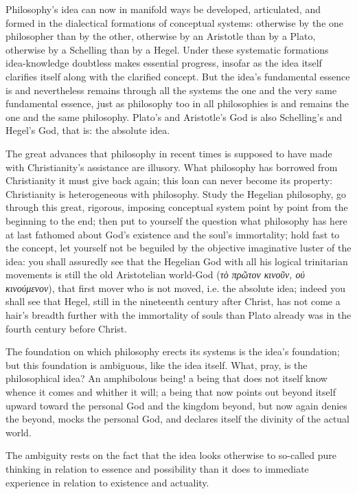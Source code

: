 \documentclass[12pt,a4paper]{book}
\begin{document}
Philosophy's idea can now in manifold ways be developed, articulated, and formed in the
dialectical formations of conceptual systems: otherwise by the one philosopher than by the
other, otherwise by an Aristotle than by a Plato, otherwise by a Schelling than by a Hegel.
Under these systematic formations idea-knowledge doubtless makes essential progress,
insofar as the idea itself clarifies itself along with the clarified concept. But the
idea's fundamental essence is and nevertheless remains through all the systems the one and
the very same fundamental essence, just as philosophy too in all philosophies is and
remains the one and the same philosophy. Plato's and Aristotle's God is also Schelling's
and Hegel's God, that is: the absolute idea.

The great advances that philosophy in recent times is supposed to have made with
Christianity's assistance are illusory. What philosophy has borrowed from Christianity it
must give back again; this loan can never become its property: Christianity is
heterogeneous with philosophy. Study the Hegelian philosophy, go through this great,
rigorous, imposing conceptual system point by point from the beginning to the end; then
put to yourself the question what philosophy has here at last fathomed about God's
existence and the soul's immortality; hold fast to the concept, let yourself not be
beguiled by the objective imaginative luster of the idea: you shall assuredly see that the
Hegelian God with all his logical trinitarian movements is still the old
Aristotelian world-God (\textit{τὸ πρῶτον κινοῦν, οὐ κινούμενον}), that first mover who is
not moved, i.e. the absolute idea; indeed you shall see that Hegel, still in the nineteenth
century after Christ, has not come a hair's breadth further with the immortality of souls
than Plato already was in the fourth century before Christ.

The foundation on which philosophy erects its systems is the idea's foundation; but this
foundation is ambiguous, like the idea itself. What, pray, is the philosophical idea? An
amphibolous being! a being that does not itself know whence it comes and whither it will;
a being that now points out beyond itself upward toward the personal God and the kingdom
beyond, but now again denies the beyond, mocks the personal God, and declares itself the
divinity of the actual world.

The ambiguity rests on the fact that the idea looks otherwise to so-called pure thinking in
relation to essence and possibility than it does to immediate experience in relation to
existence and actuality.
\end{document}
